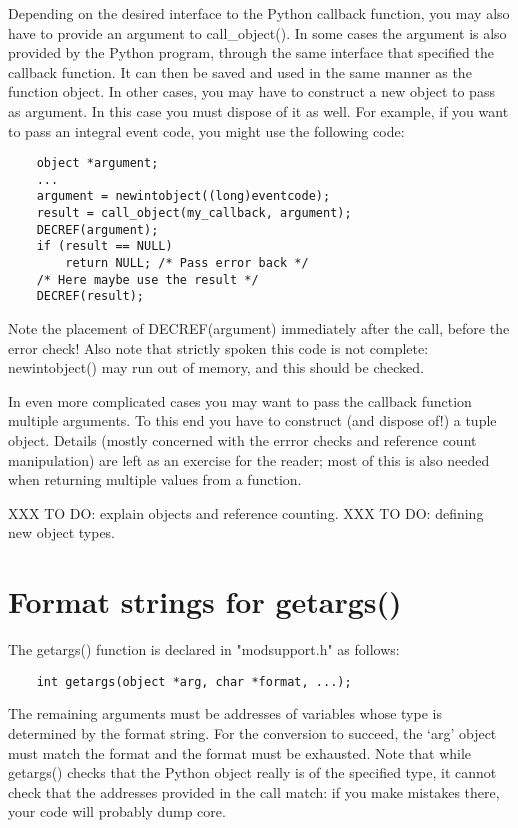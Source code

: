 Depending on the desired interface to the Python callback function,
you may also have to provide an argument to call_object().  In some
cases the argument is also provided by the Python program, through the
same interface that specified the callback function.  It can then be
saved and used in the same manner as the function object.  In other
cases, you may have to construct a new object to pass as argument.  In
this case you must dispose of it as well.  For example, if you want to
pass an integral event code, you might use the following code:

\begin{verbatim}
    object *argument;
    ...
    argument = newintobject((long)eventcode);
    result = call_object(my_callback, argument);
    DECREF(argument);
    if (result == NULL)
        return NULL; /* Pass error back */
    /* Here maybe use the result */
    DECREF(result);
\end{verbatim}

Note the placement of DECREF(argument) immediately after the call,
before the error check!  Also note that strictly spoken this code is
not complete: newintobject() may run out of memory, and this should be
checked.

In even more complicated cases you may want to pass the callback
function multiple arguments.  To this end you have to construct (and
dispose of!) a tuple object.  Details (mostly concerned with the
errror checks and reference count manipulation) are left as an
exercise for the reader; most of this is also needed when returning
multiple values from a function.

XXX TO DO: explain objects and reference counting.
XXX TO DO: defining new object types.


\section{Format strings for getargs()}

The getargs() function is declared in "modsupport.h" as follows:

\begin{verbatim}
    int getargs(object *arg, char *format, ...);
\end{verbatim}

The remaining arguments must be addresses of variables whose type is
determined by the format string.  For the conversion to succeed, the
`arg' object must match the format and the format must be exhausted.
Note that while getargs() checks that the Python object really is of
the specified type, it cannot check that the addresses provided in the
call match: if you make mistakes there, your code will probably dump
core.

